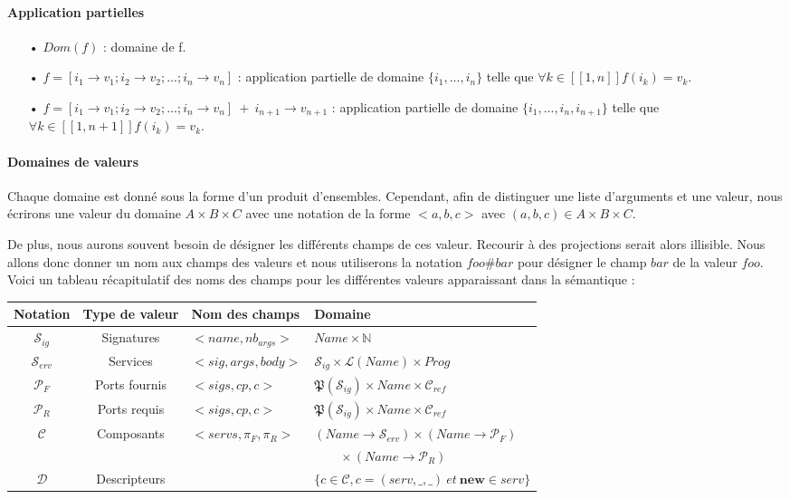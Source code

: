 \documentclass[11pt,a4paper,fleqn]{report}
\newcommand{\D}{\mathcal{D}}
\newcommand{\C}{\mathcal{C}}
\newcommand{\Cref}{\mathcal{C}_{ref}}
\newcommand{\PR}{\mathcal{P}_R}
\newcommand{\PF}{\mathcal{P}_F}
\newcommand{\Sig}{\mathcal{S}_{ig}}
\newcommand{\Serv}{\mathcal{S}_{erv}}
\begin{document}
\begin{appendices}
\paragraph{Application partielles} 
\begin{itemize}
\item[•] $Dom(f)$ : domaine de f.
\item[•] $f = [i_1 \rightarrow v_1; i_2 \rightarrow v_2 ; ... ; i_n \rightarrow v_n]$ : application partielle de domaine $\{i_1, ... , i_n\}$ telle que $\forall k \in [\![1,n]\!]f(i_k) = v_k$.
\item[•] $f = [i_1 \rightarrow v_1; i_2 \rightarrow v_2 ; ... ; i_n \rightarrow v_n] ~+~ i_{n+1} \rightarrow v_{n+1}$ : application partielle de domaine $\{i_1, ... , i_n, i_{n+1}\}$ telle que $\forall k \in [\![1,n+1]\!]f(i_k) = v_k$.
\end{itemize}


\paragraph{Domaines de valeurs}
Chaque domaine est donné sous la forme d'un produit d'ensembles. Cependant, afin de distinguer une liste d'arguments et une valeur, nous écrirons une valeur du domaine $A\times B\times C$ avec une notation de la forme $<a,b,c>$ avec $(a,b,c)\in A\times B \times C$.

De plus, nous aurons souvent besoin de désigner les différents champs de ces valeur. Recourir à des projections serait alors illisible. Nous allons donc donner un nom aux champs des valeurs et nous utiliserons la notation $foo\#bar$ pour désigner le champ $bar$ de la valeur $foo$. Voici un tableau récapitulatif des noms des champs pour les différentes valeurs apparaissant dans la sémantique :

\begin{table}[!h]
\begin{center}
\begin{tabular}{|c|c|l|l|}

\hline
Notation & Type de valeur & Nom des champs & Domaine\\
\hline
 $\Sig$  &  Signatures & $<name,nb_{args}>$ &$Name \times \mathbb{N}$\\
 $\Serv$ & Services & $<sig,args,body>$ &$\Sig \times \mathcal{L}(Name) \times Prog$ \\
 $\PF$ & Ports fournis & $<sigs,cp,c>$ &$\mathfrak{P}(\Sig) \times Name \times \Cref$\\
 $\PR$ & Ports requis & $<sigs,cp,c>$ &$\mathfrak{P}(\Sig) \times Name \times \Cref$ \\
 $\C$ & Composants & $<servs,\pi_F,\pi_R>$ &$(Name \rightarrow \Serv)\times(Name \rightarrow \PF) $\\
&&& $\qquad \times (Name \rightarrow \PR) $\\
 $\D$ &  Descripteurs & &$ \{c\in \C, c = (serv,\_,\_)~et~ \textbf{new} \in serv\} $\\


\end{tabular}
\end{center}
\end{table}
\end{appendices}
\end{document}

